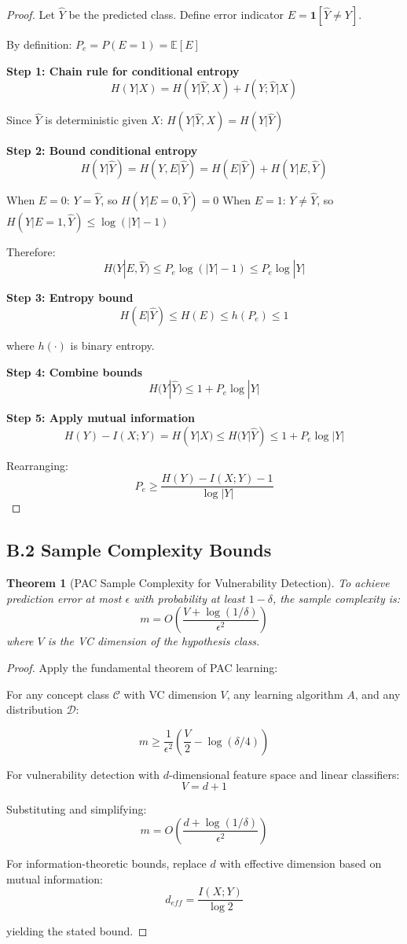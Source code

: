 \documentclass[journal]{IEEEtran}
\newtheorem{theorem}{Theorem}
\begin{document}
\begin{proof}
Let $\hat{Y}$ be the predicted class. Define error indicator $E = \mathbf{1}[\hat{Y} \neq Y]$.

By definition: $P_e = P(E = 1) = \mathbb{E}[E]$

\textbf{Step 1: Chain rule for conditional entropy}
$$H(Y|X) = H(Y|\hat{Y}, X) + I(Y; \hat{Y}|X)$$

Since $\hat{Y}$ is deterministic given $X$: $H(Y|\hat{Y}, X) = H(Y|\hat{Y})$

\textbf{Step 2: Bound conditional entropy}
$$H(Y|\hat{Y}) = H(Y, E|\hat{Y}) = H(E|\hat{Y}) + H(Y|E, \hat{Y})$$

When $E = 0$: $Y = \hat{Y}$, so $H(Y|E=0, \hat{Y}) = 0$
When $E = 1$: $Y \neq \hat{Y}$, so $H(Y|E=1, \hat{Y}) \leq \log(|Y|-1)$

Therefore:
$$H(Y|E, \hat{Y}) \leq P_e \log(|Y|-1) \leq P_e \log |Y|$$

\textbf{Step 3: Entropy bound}
$$H(E|\hat{Y}) \leq H(E) \leq h(P_e) \leq 1$$

where $h(\cdot)$ is binary entropy.

\textbf{Step 4: Combine bounds}
$$H(Y|\hat{Y}) \leq 1 + P_e \log |Y|$$

\textbf{Step 5: Apply mutual information}
$$H(Y) - I(X;Y) = H(Y|X) \leq H(Y|\hat{Y}) \leq 1 + P_e \log |Y|$$

Rearranging:
$$P_e \geq \frac{H(Y) - I(X;Y) - 1}{\log |Y|}$$
\end{proof}

\subsection{B.2 Sample Complexity Bounds}

\begin{theorem}[PAC Sample Complexity for Vulnerability Detection]
To achieve prediction error at most $\epsilon$ with probability at least $1-\delta$, the sample complexity is:
$$m = O\left(\frac{V + \log(1/\delta)}{\epsilon^2}\right)$$
where $V$ is the VC dimension of the hypothesis class.
\end{theorem}

\begin{proof}
Apply the fundamental theorem of PAC learning:

For any concept class $\mathcal{C}$ with VC dimension $V$, any learning algorithm $A$, and any distribution $\mathcal{D}$:

$$m \geq \frac{1}{\epsilon^2}\left(\frac{V}{2} - \log(\delta/4)\right)$$

For vulnerability detection with $d$-dimensional feature space and linear classifiers:
$$V = d + 1$$

Substituting and simplifying:
$$m = O\left(\frac{d + \log(1/\delta)}{\epsilon^2}\right)$$

For information-theoretic bounds, replace $d$ with effective dimension based on mutual information:
$$d_{eff} = \frac{I(X;Y)}{\log 2}$$

yielding the stated bound.
\end{proof}
\end{document}
